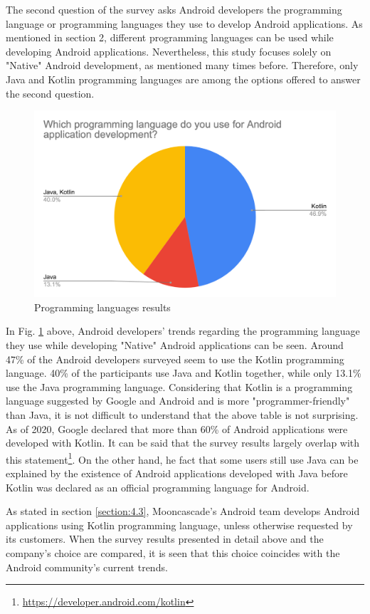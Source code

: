 The second question of the survey asks Android developers the programming language or programming languages they use to develop Android applications. As mentioned in section 2, different programming languages can be used while developing Android applications. Nevertheless, this study focuses solely on "Native" Android development, as mentioned many times before. Therefore, only Java and Kotlin programming languages are among the options offered to answer the second question.
\begin{figure}[ht!]
    \centering
    \includegraphics[scale=0.3]{figures/programming_language.png}
    \caption{Programming languages results}
    \label{fig:programming_languages}
\end{figure}

In Fig. \ref{fig:programming_languages} above, Android developers' trends regarding the programming language they use while developing "Native" Android applications can be seen. Around 47\% of the Android developers surveyed seem to use the Kotlin programming language. 40\% of the participants use Java and Kotlin together, while only 13.1\% use the Java programming language. Considering that Kotlin is a programming language suggested by Google and Android and is more "programmer-friendly" than Java, it is not difficult to understand that the above table is not surprising. As of 2020, Google declared that more than 60\% of Android applications were developed with Kotlin. It can be said that the survey results largely overlap with this statement\footnote{\url{https://developer.android.com/kotlin}}. On the other hand, he fact that some users still use Java can be explained by the existence of Android applications developed with Java before Kotlin was declared as an official programming language for Android.

As stated in section \ref{section:4.3}, Mooncascade's Android team develops Android applications using Kotlin programming language, unless otherwise requested by its customers. When the survey results presented in detail above and the company's choice are compared, it is seen that this choice coincides with the Android community’s current trends.